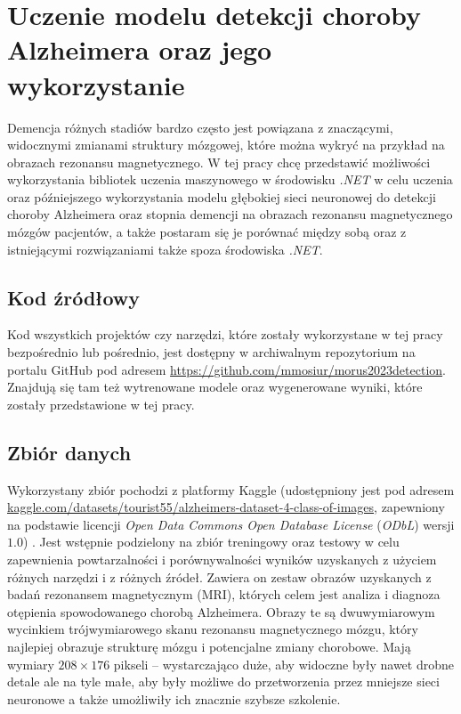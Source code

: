\chapter{Uczenie modelu detekcji choroby Alzheimera oraz jego wykorzystanie}

Demencja różnych stadiów bardzo często jest powiązana z znaczącymi, widocznymi zmianami struktury mózgowej, które można wykryć na przykład na obrazach rezonansu magnetycznego.
W tej pracy chcę przedstawić możliwości wykorzystania bibliotek uczenia maszynowego w środowisku \emph{.NET} w celu uczenia oraz późniejszego wykorzystania modelu głębokiej sieci neuronowej do detekcji choroby Alzheimera oraz stopnia demencji na obrazach rezonansu magnetycznego mózgów pacjentów, a także postaram się je porównać między sobą oraz z istniejącymi rozwiązaniami także spoza środowiska \emph{.NET}.

\section{Kod źródłowy}
\label{sec:source-code}

Kod wszystkich projektów czy narzędzi, które zostały wykorzystane w tej pracy bezpośrednio lub pośrednio, jest dostępny w archiwalnym repozytorium na portalu GitHub pod adresem \url{https://github.com/mmosiur/morus2023detection}.
Znajdują się tam też wytrenowane modele oraz wygenerowane wyniki, które zostały przedstawione w tej pracy.

\section{Zbiór danych}
\label{sec:dataset}

Wykorzystany zbiór pochodzi z platformy Kaggle (udostępniony jest pod adresem \url{kaggle.com/datasets/tourist55/alzheimers-dataset-4-class-of-images}, zapewniony na podstawie licencji \emph{Open Data Commons Open Database License} (\emph{ODbL}) wersji $1.0$) \cite{kaggle-alzheimers-dataset}.
Jest wstępnie podzielony na zbiór treningowy oraz testowy w celu zapewnienia powtarzalności i porównywalności wyników uzyskanych z użyciem różnych narzędzi i z różnych źródeł.
Zawiera on zestaw obrazów uzyskanych z badań rezonansem magnetycznym (MRI), których celem jest analiza i diagnoza otępienia spowodowanego chorobą Alzheimera.
Obrazy te są dwuwymiarowym wycinkiem trójwymiarowego skanu rezonansu magnetycznego mózgu, który najlepiej obrazuje strukturę mózgu i potencjalne zmiany chorobowe.
Mają wymiary $208 \times 176$ pikseli -- wystarczająco duże, aby widoczne były nawet drobne detale ale na tyle małe, aby były możliwe do przetworzenia przez mniejsze sieci neuronowe a także umożliwiły ich znacznie szybsze szkolenie.

